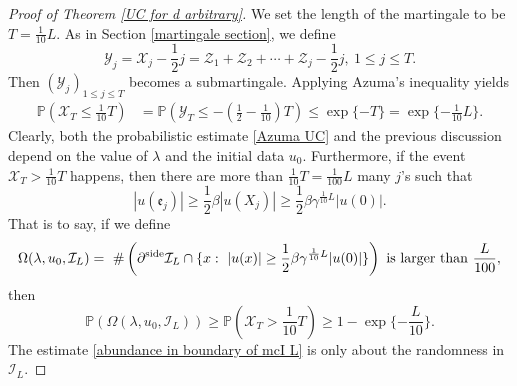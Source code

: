 \documentclass[11pt,reqno,UTF8,twoside]{amsart}
\renewcommand{\P}{\mathbb{P}}
\newcommand{\mcI}{\mathcal{I}}
\newcommand{\mcX}{\mathcal{X}}
\newcommand{\mcY}{\mathcal{Y}}
\newcommand{\mcZ}{\mathcal{Z}}
\newcommand{\partialside}{\partial^{\text{side}}}
\theoremstyle{definition}
\numberwithin{equation}{section}
\begin{document}
\begin{proof}[Proof of Theorem \ref{UC for d arbitrary}]
We set the length of the martingale to be  $T=\frac{1}{10}L$. As in Section \ref{martingale section}, we define
\begin{equation}\label{mcY, UC}
  \mcY_j=\mcX_j-\frac{1}{2}j=\mcZ_1+\mcZ_2+\cdots + \mcZ_j-\frac{1}{2}j,\ 1\leq j\leq T.
\end{equation}
Then $(\mcY_j)_{1\leq j\leq T}$ becomes a submartingale. Applying Azuma's inequality yields
\begin{align}\label{Azuma UC}
  \P\left(\mcX_T \leq \frac{1}{10}T \right) & = \P\left(\mcY_T \leq -(\frac{1}{2}-\frac{1}{10})T \right) \leq \exp\{-T\}=\exp\{-\frac{1}{10}L\}.
\end{align}
Clearly, both the probabilistic estimate \eqref{Azuma UC} and the previous discussion   depend on the value of $\lambda$ and the initial data $u_0$. Furthermore, if the event $\mcX_T>\frac{1}{10}T$ happens, then there are more than $\frac{1}{10}T=\frac{1}{100}L$ many   $j$'s  such that 
\[|u(\mathfrak{e}_j)|\geq \frac{1}{2}\beta |u(X_j)|\geq \frac{1}{2}\beta\gamma^{\frac{1}{10}L} |u(0)|.\] 
That is to say, if we  define  %
\[\Omega(\lambda,u_0,\mcI_L)= \ \#\left(  \partialside \mcI_L\cap \{ x:\  |u(x)| \geq  \frac{1}{2}\beta\gamma^{\frac{1}{10}L} |u(0)| \} \right) \ {\rm is \ larger \ than\ } \frac{L}{100},\]
then 
\begin{equation}\label{abundance in boundary of mcI L}
  \P\left(\Omega(\lambda,u_0,\mcI_L) \right) \geq \P\left(\mcX_T > \frac{1}{10}T \right)\geq 1-\exp\{-\frac{L}{10}\}.
\end{equation}
The  estimate \eqref{abundance in boundary of mcI L} is only about the randomness in $\mcI_L$.


\end{proof}
\end{document}
